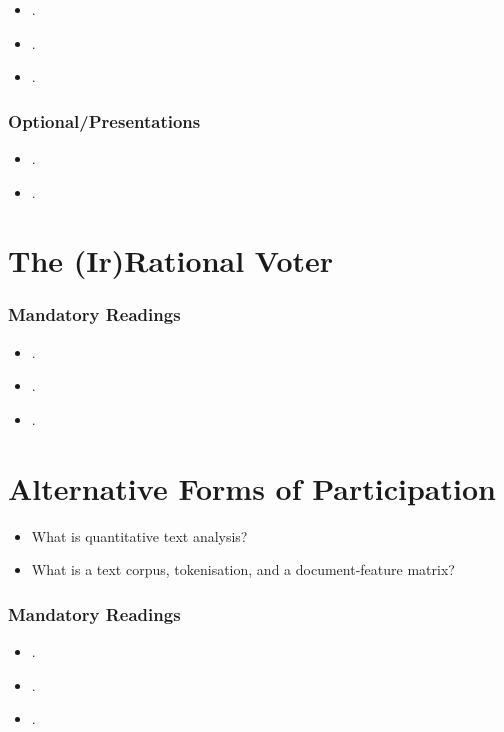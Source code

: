 \documentclass[abstract=on,parskip=full,headings=standardclasses,fontsize=11pt,paper=a4]{scrartcl}
\begin{document}
\begin{itemize}
\item {}.
\item {}.
\item {}.
\end{itemize}


\subsubsection*{Optional/Presentations}
\begin{itemize}
\item {}.
\item {}.
\end{itemize}

 
\section{The (Ir)Rational Voter}


\subsubsection*{Mandatory Readings}


 \begin{itemize}
\item {}.
\item {}.
\item {}.
\end{itemize}

\section{Alternative Forms of Participation}

\begin{itemize}
\renewcommand\labelitemi{--}
\item What is quantitative text analysis?
\item What is a text corpus, tokenisation, and a document-feature matrix?
\end{itemize}

\subsubsection*{Mandatory Readings}
\begin{itemize}
\item {}.
\item {}.
\item {}.
\end{itemize}
\end{document}
